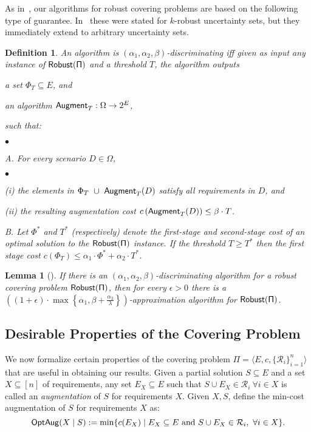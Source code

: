 \documentclass[11pt,letterpaper]{article}
\newtheorem{definition}[theorem]{Definition}
\newtheorem{lemma}[theorem]{Lemma}
\def\rs{\mathcal{R}}
\def\cov{\ensuremath{\Pi}\xspace}
\def\rcov{{\sf Robust(\cov)}\xspace}
\def\fst{\ensuremath {\Phi_T}\xspace}
\def\snd{\ensuremath {{\sf Augment}_T}\xspace}
\newcommand{\sse}{\subseteq}
\newcommand{\optaug}{{\sf OptAug}}
\newcounter{note}[section]
\newcommand{\initOneLiners}{\setlength{\itemsep}{0pt}
    \setlength{\parsep }{0pt}
    \setlength{\topsep }{0pt}
}
\newenvironment{OneLiners}[1][\ensuremath{\bullet}]
    {\begin{list}
        {#1}
        {\initOneLiners}}
    {\end{list}}
\newcommand{\Tstar}{\ensuremath{T^*}\xspace}
\newcommand{\Phistar}{\ensuremath{\Phi^*}\xspace}
\begin{document}
As in~\cite{GNR-k-rob}, our algorithms for robust covering problems are based on the following type of guarantee.
In~\cite{GNR-k-rob} these were stated for $k$-robust uncertainty sets, but they immediately extend to arbitrary
uncertainty sets.
\begin{definition}\label{defn:algo}
  An algorithm is \emph{$(\alpha_1,\alpha_2,\beta)$-discriminating} iff
  given as input any instance of $\rcov$ and a threshold $T$, the
  algorithm outputs
  \begin{inparaenum}[(i)]
  \item a set $\fst\sse E$, and
  \item an algorithm $\snd: \Omega\rightarrow
    2^E$,
  \end{inparaenum}
  such that:
  \begin{OneLiners}
  \item[A.] For every scenario $D \in \Omega$,
    \begin{OneLiners}
    \item[(i)] the elements in $\fst~\cup ~\snd(D)$ satisfy all
      requirements in $D$, and
    \item[(ii)] the resulting augmentation cost
      $c\left(\snd(D)\right)\le \beta\cdot T$.
    \end{OneLiners}
  \item[B.] Let $\Phistar$ and $\Tstar$ (respectively) denote the
    first-stage and second-stage cost of an optimal solution to the
    $\rcov$ instance. If the threshold $T\ge \Tstar$ then the first stage
    cost $c(\fst)\le \alpha_1\cdot \Phistar + \alpha_2\cdot \Tstar$.
  \end{OneLiners}
\end{definition}

\begin{lemma}[\cite{GNR-k-rob}]\label{lem:apx}
  If there is an $(\alpha_1,\alpha_2,\beta)$-discriminating algorithm
  for a robust covering problem $\rcov$, then for every $\epsilon > 0$
  there is a $\left((1+\epsilon)\cdot\max\left\{\alpha_1,
    \beta+\frac{\alpha_2}\lambda\right\} \right)$-approximation algorithm for $\rcov$.
\end{lemma}

\subsection{Desirable Properties of the Covering Problem} We now formalize certain properties of the covering problem
$\cov =\langle E,c,\{\rs_i\}_{i=1}^n\rangle$ that are useful in obtaining our results.
Given a partial solution $S\sse E$ and a set $X \sse [n]$ of requirements, any set $E_X \sse E$ such that $S \cup E_X
\in \mathcal{R}_i ~\forall i\in X$ is called an \emph{augmentation} of $S$ for requirements $X$. Given $X, S$, define
the min-cost augmentation of $S$ for requirements $X$ as:
$$\optaug(X\mid S):= \min \{c(E_X)\mid E_X \sse E \text{ and } S\cup E_X\in \mathcal{R}_i,~\forall i\in X\}.$$
\end{document}
